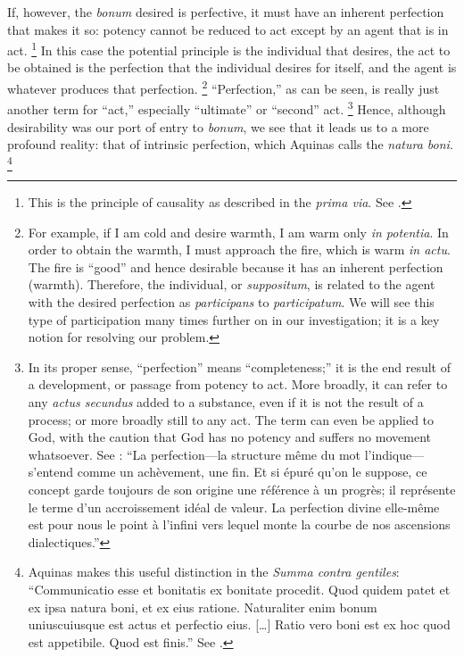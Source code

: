 {If, however, the \emph{bonum} desired is perfective, it must have an inherent perfection that makes it so: potency cannot be reduced to act except by an agent that is in act.%
%
\footnote{This is the principle of causality as described in the \emph{prima via}. See \cite[I, q.~2, a.~3, co.]{st:summa}.}
%
In this case the potential principle is the individual that desires, the act to be obtained is the perfection that the individual desires for itself, and the agent is whatever produces that perfection.%
%
\footnote{For example, if I am cold and desire warmth, I am warm only \emph{in potentia}. In order to obtain the warmth, I must approach the fire, which is warm \emph{in actu}. The fire is ``good'' and hence desirable because it has an inherent perfection (warmth). Therefore, the individual, or \emph{suppositum}, is related to the agent with the desired perfection as \emph{participans} to \emph{participatum}. We will see this type of participation many times further on in our investigation; it is a key notion for resolving our problem.}
%
``Perfection,'' as can be seen, is really just another term for ``act,'' especially ``ultimate'' or ``second'' act.%
%
\footnote{In its proper sense, ``perfection'' means ``completeness;'' it is the end result of a development, or passage from potency to act. More broadly, it can refer to any \emph{actus secundus} added to a substance, even if it is not the result of a process; or more broadly still to any act. The term can even be applied to God, with the caution that God has no potency and suffers no movement whatsoever.
See \cite[193]{definance:etre-et-agir}: ``La perfection---la structure même du mot l'indique---s'entend comme un achèvement, une fin. Et si épuré qu'on le suppose, ce concept garde toujours de son origine une référence à un progrès; il représente le terme d'un accroissement idéal de valeur. La perfection divine elle-même est pour nous le point à l'infini vers lequel monte la courbe de nos ascensions dialectiques.''}
%
Hence, although desirability was our port of entry to \emph{bonum}, we see that it leads us to a more profound reality: that of intrinsic perfection, which Aquinas calls the \emph{natura boni}.%
%
\footnote{Aquinas makes this useful distinction in the \emph{Summa contra gentiles}: ``Communicatio esse et bonitatis ex bonitate procedit. Quod quidem patet et ex ipsa natura boni, et ex eius ratione. Naturaliter enim bonum uniuscuiusque est actus et perfectio eius. [\ldots] Ratio vero boni est ex hoc quod est appetibile. Quod est finis.'' See \cite[I, cap.~37, n.~5 (Marietti n.~307)]{st:contragent}.
}}
